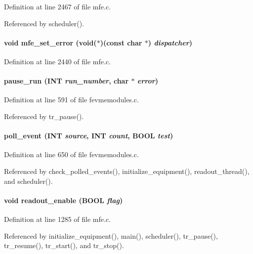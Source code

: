 Definition at line 2467 of file mfe.c.

Referenced by scheduler().
\paragraph[{mfe\_\-set\_\-error}]{\setlength{\rightskip}{0pt plus 5cm}void mfe\_\-set\_\-error (void($\ast$)(const char $\ast$) {\em dispatcher})}\hfill\label{mfe_8c_ac26d0645ab25d03dd40fa9ea8baa7c0d}


Definition at line 2440 of file mfe.c.
\paragraph[{pause\_\-run}]{ pause\_\-run ({\bf INT} {\em run\_\-number}, \/  char $\ast$ {\em error})}\hfill\label{mfe_8c_a164db20cf6c8c81e8c8ca50a590de436}


Definition at line 591 of file fevmemodules.c.

Referenced by tr\_\-pause().
\paragraph[{poll\_\-event}]{ poll\_\-event ({\bf INT} {\em source}, \/  {\bf INT} {\em count}, \/  {\bf BOOL} {\em test})}\hfill\label{mfe_8c_a98cc3257284af91fa0e8da10ddf227c8}


Definition at line 650 of file fevmemodules.c.

Referenced by check\_\-polled\_\-events(), initialize\_\-equipment(), readout\_\-thread(), and scheduler().
\paragraph[{readout\_\-enable}]{\setlength{\rightskip}{0pt plus 5cm}void readout\_\-enable ({\bf BOOL} {\em flag})}\hfill\label{mfe_8c_a1f7c4819ed16e337192ca7426ae273ca}


Definition at line 1285 of file mfe.c.

Referenced by initialize\_\-equipment(), main(), scheduler(), tr\_\-pause(), tr\_\-resume(), tr\_\-start(), and tr\_\-stop().
